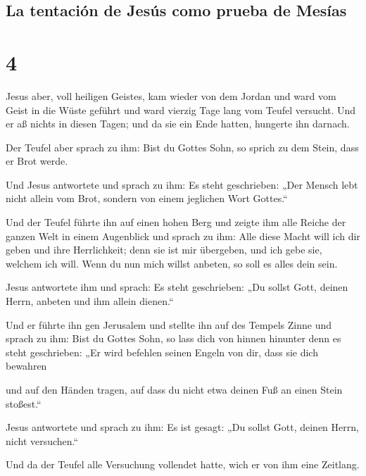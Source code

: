\hypertarget{la-tentaciuxf3n-de-jesuxfas-como-prueba-de-mesuxedas}{%
\subsection{La tentación de Jesús como prueba de
Mesías}\label{la-tentaciuxf3n-de-jesuxfas-como-prueba-de-mesuxedas}}

\hypertarget{section-3}{%
\section{4}\label{section-3}}

 Jesus aber, voll heiligen Geistes, kam wieder von dem
Jordan und ward vom Geist in die Wüste geführt  und ward
vierzig Tage lang vom Teufel versucht. Und er aß nichts in diesen Tagen;
und da sie ein Ende hatten, hungerte ihn darnach.

 Der Teufel aber sprach zu ihm: Bist du Gottes Sohn, so
sprich zu dem Stein, dass er Brot werde.

 Und Jesus antwortete und sprach zu ihm: Es steht
geschrieben: „Der Mensch lebt nicht allein vom Brot, sondern von einem
jeglichen Wort Gottes.``

 Und der Teufel führte ihn auf einen hohen Berg und zeigte
ihm alle Reiche der ganzen Welt in einem Augenblick  und
sprach zu ihm: Alle diese Macht will ich dir geben und ihre
Herrlichkeit; denn sie ist mir übergeben, und ich gebe sie, welchem ich
will.  Wenn du nun mich willst anbeten, so soll es alles
dein sein.

 Jesus antwortete ihm und sprach: Es steht geschrieben:
„Du sollst Gott, deinen Herrn, anbeten und ihm allein dienen.``

 Und er führte ihn gen Jerusalem und stellte ihn auf des
Tempels Zinne und sprach zu ihm: Bist du Gottes Sohn, so lass dich von
hinnen hinunter  denn es steht geschrieben: „Er wird
befehlen seinen Engeln von dir, dass sie dich bewahren

 und auf den Händen tragen, auf dass du nicht etwa deinen
Fuß an einen Stein stoßest.``

 Jesus antwortete und sprach zu ihm: Es ist gesagt: „Du
sollst Gott, deinen Herrn, nicht versuchen.``

 Und da der Teufel alle Versuchung vollendet hatte, wich
er von ihm eine Zeitlang.

